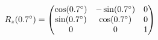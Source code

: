 \documentclass[preview]{standalone}
\begin{document}
\begin{align*}
\special{dvisvgm:raw <g id='unique000'>}R_z(0.7^\circ) = \begin{pmatrix} \cos(0.7^\circ) & -\sin(0.7^\circ) & 0 \\ \sin(0.7^\circ) & \cos(0.7^\circ) & 0 \\ 0 & 0 & 1 \end{pmatrix}\special{dvisvgm:raw </g>}
\end{align*}
\end{document}
